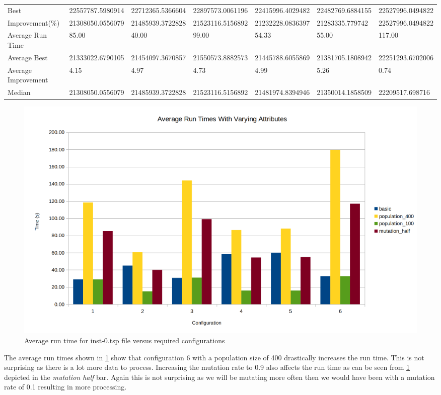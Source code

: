 \begin{table}[H]
{\begin{tabular}{lllllll}
\cellcolor[HTML]{ECF4FF}Best                & 22557787.5980914 & 22712365.5366604 & 22897573.0061196 & 22415996.4029482 & 22482769.6884155 & 22527996.0494822 \\
\cellcolor[HTML]{ECF4FF}Improvement(\%)     & 21308050.0556079 & 21485939.3722828 & 21523116.5156892 & 21232228.0836397 & 21283335.779742  & 22527996.0494822 \\
\rowcolor[HTML]{CBCEFB} 
\cellcolor[HTML]{DAE8FC}Average Run Time    & 85.00            & 40.00            & 99.00            & 54.33            & 55.00            & 117.00           \\
\rowcolor[HTML]{CBCEFB} 
\cellcolor[HTML]{DAE8FC}Average Best        & 21333022.6790105 & 21454097.3670857 & 21550573.8882573 & 21445788.6055869 & 21381705.1808942 & 22251293.6702006 \\
\rowcolor[HTML]{CBCEFB} 
\cellcolor[HTML]{DAE8FC}Average Improvement & 4.15             & 4.97             & 4.73             & 4.99             & 5.26             & 0.74             \\
\rowcolor[HTML]{CBCEFB} 
\cellcolor[HTML]{DAE8FC}Median              & 21308050.0556079 & 21485939.3722828 & 21523116.5156892 & 21481974.8394946 & 21350014.1858509 & 22209517.698716 
\end{tabular}%
}
\end{table}


\begin{figure}[H]
\vspace{-5pt}
\centering
\includegraphics[width=1.0\textwidth]{images/inst-0-run-time.png}
\caption{\label{fig:inst-0-run-time}Average run time for inst-0.tsp file versus required configurations}
\end{figure}

The average run times shown in \ref{fig:inst-0-run-time} show that configuration 6 with a population size of 400 drastically increases the run time. This is not surprising as there is a lot more data to process.
Increasing the mutation rate to 0.9 also affects the run time as can be seen from \ref{fig:inst-0-run-time} depicted in the \textit{mutation half} bar. Again this is not surprising as we will be mutating more often then we would have been with a mutation rate of 0.1 resulting in more processing.

